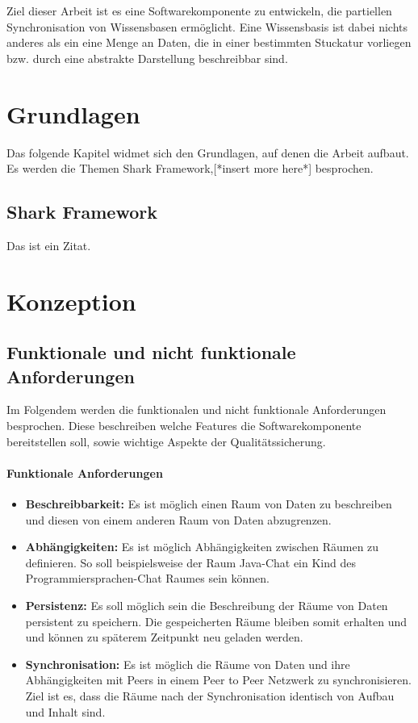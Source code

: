 \documentclass[a4paper]{article}
\begin{document}
	

	
	Ziel dieser Arbeit ist es eine Softwarekomponente zu entwickeln, die 
	partiellen Synchronisation von Wissensbasen ermöglicht. Eine Wissensbasis
	ist dabei nichts anderes als ein eine Menge an Daten, die in einer
	bestimmten Stuckatur vorliegen bzw. durch eine abstrakte Darstellung
	beschreibbar sind. 
	
	\section{Grundlagen}
	\label{sec:sharkthemes}	
	
	Das folgende Kapitel widmet sich den Grundlagen, auf denen die Arbeit
	aufbaut. Es werden die Themen Shark Framework,[*insert more here*]	
	besprochen.
	
	\subsection{Shark Framework}
	
	Das ist ein Zitat. \cite{SharkFW}
	
	\section{Konzeption}	
	
	\subsection{Funktionale und nicht funktionale Anforderungen}
	
	Im Folgendem werden die funktionalen und nicht funktionale
	Anforderungen besprochen. Diese	beschreiben welche Features die
	Softwarekomponente bereitstellen soll, sowie wichtige Aspekte der
	Qualitätssicherung.
	
	\paragraph{Funktionale Anforderungen}
	\begin{itemize}
		\item \textbf{Beschreibbarkeit:} Es ist möglich einen Raum von
		Daten zu beschreiben und diesen von einem anderen Raum
		von Daten abzugrenzen. 
		\item \textbf{Abhängigkeiten:} Es ist möglich Abhängigkeiten zwischen
		Räumen zu definieren. So soll beispielsweise der Raum Java-Chat ein 
		Kind des Programmiersprachen-Chat Raumes sein können.
		\item \textbf{Persistenz:} Es soll möglich sein die Beschreibung der
		Räume von Daten persistent zu speichern. Die gespeicherten Räume
		bleiben somit erhalten und und können zu späterem Zeitpunkt neu
		geladen werden.
		\item \textbf{Synchronisation:} Es ist möglich die Räume von Daten 
		und ihre Abhängigkeiten mit Peers in einem Peer to Peer Netzwerk 
		zu synchronisieren. Ziel ist es, dass die Räume nach der 
		Synchronisation identisch von Aufbau und Inhalt sind.
	\end{itemize} 	
	
\end{document}
